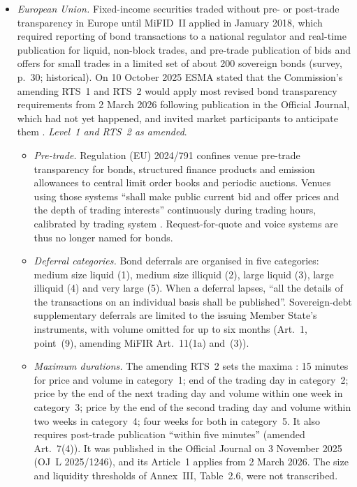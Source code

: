 \begin{qfrule}
\begin{itemize}
Until then the presently effective exclusion is the non-member-affiliate one; the displayed text of Rule 6750(d)(1), which already reads ``Affiliate---principal transaction indicator'', is the future wording. The proposal of the SEC's Fixed Income Market Structure Advisory Committee to delay dissemination of very large trades by 48 hours was a proposal, not a rule (survey, p.~29).
\item \emph{European Union.} Fixed-income securities traded without pre- or post-trade transparency in Europe until MiFID~II applied in January 2018, which required reporting of bond transactions to a national regulator and real-time publication for liquid, non-block trades, and pre-trade publication of bids and offers for small trades in a limited set of about 200 sovereign bonds (survey, p.~30; historical). On 10 October 2025 ESMA stated that the Commission's amending RTS~1 and RTS~2 would apply most revised bond transparency requirements from 2 March 2026 following publication in the Official Journal, which had not yet happened, and invited market participants to anticipate them \citep[p.~4]{esma-mifir-review-statement-2025}. \emph{Level~1 and RTS~2 as amended}.
\begin{itemize}
\item \emph{Pre-trade.} Regulation (EU) 2024/791 confines venue pre-trade transparency for bonds, structured finance products and emission allowances to central limit order books and periodic auctions. Venues using those systems ``shall make public current bid and offer prices and the depth of trading interests'' continuously during trading hours, calibrated by trading system \citep[Art.~1, point~(5), replacing MiFIR Art.~8(1)--(2) and deleting Art.~8(3)--(4)]{eu-2024-791}. Request-for-quote and voice systems are thus no longer named for bonds.
\item \emph{Deferral categories.} Bond deferrals are organised in five categories: medium size liquid (1), medium size illiquid (2), large liquid (3), large illiquid (4) and very large (5). When a deferral lapses, ``all the details of the transactions on an individual basis shall be published''. Sovereign-debt supplementary deferrals are limited to the issuing Member State's instruments, with volume omitted for up to six months (Art.~1, point~(9), amending MiFIR Art.~11(1a) and~(3)).
\item \emph{Maximum durations.} The amending RTS~2 sets the maxima \citep[Art.~1, point~(7), inserting Art.~8a(1) into Delegated Regulation 2017/583]{eu-2025-1246}: 15 minutes for price and volume in category~1; end of the trading day in category~2; price by the end of the next trading day and volume within one week in category~3; price by the end of the second trading day and volume within two weeks in category~4; four weeks for both in category~5. It also requires post-trade publication ``within five minutes'' (amended Art.~7(4)). It was published in the Official Journal on 3 November 2025 (OJ~L 2025/1246), and its Article~1 applies from 2 March 2026. The size and liquidity thresholds of Annex~III, Table~2.6, were not transcribed.

\end{itemize}
\end{itemize}
\end{qfrule}
